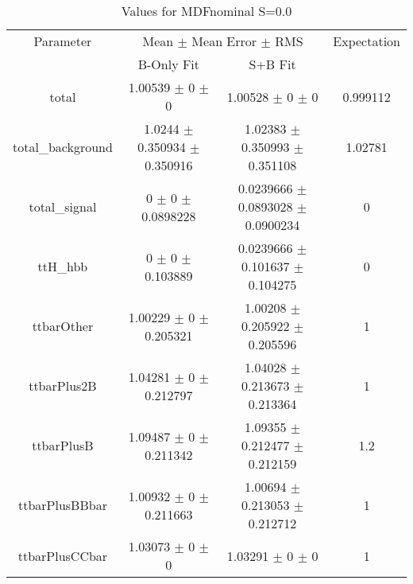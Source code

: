 \begin{table}
\centering
\caption{Values for MDFnominal S=0.0}
\begin{tabular}{cccc}
\toprule
Parameter & \multicolumn{2}{c}{Mean $\pm$ Mean Error $\pm$ RMS} & Expectation\\
 & B-Only Fit & S+B Fit & \\
\midrule
total & \num{1.00539} $\pm$ \num{0} $\pm$ \num{0} & \num{1.00528} $\pm$ \num{0} $\pm$ \num{0} & \num{0.999112}\\
total\_background & \num{1.0244} $\pm$ \num{0.350934} $\pm$ \num{0.350916} & \num{1.02383} $\pm$ \num{0.350993} $\pm$ \num{0.351108} & \num{1.02781}\\
total\_signal & \num{0} $\pm$ \num{0} $\pm$ \num{0.0898228} & \num{0.0239666} $\pm$ \num{0.0893028} $\pm$ \num{0.0900234} & \num{0}\\
ttH\_hbb & \num{0} $\pm$ \num{0} $\pm$ \num{0.103889} & \num{0.0239666} $\pm$ \num{0.101637} $\pm$ \num{0.104275} & \num{0}\\
ttbarOther & \num{1.00229} $\pm$ \num{0} $\pm$ \num{0.205321} & \num{1.00208} $\pm$ \num{0.205922} $\pm$ \num{0.205596} & \num{1}\\
ttbarPlus2B & \num{1.04281} $\pm$ \num{0} $\pm$ \num{0.212797} & \num{1.04028} $\pm$ \num{0.213673} $\pm$ \num{0.213364} & \num{1}\\
ttbarPlusB & \num{1.09487} $\pm$ \num{0} $\pm$ \num{0.211342} & \num{1.09355} $\pm$ \num{0.212477} $\pm$ \num{0.212159} & \num{1.2}\\
ttbarPlusBBbar & \num{1.00932} $\pm$ \num{0} $\pm$ \num{0.211663} & \num{1.00694} $\pm$ \num{0.213053} $\pm$ \num{0.212712} & \num{1}\\
ttbarPlusCCbar & \num{1.03073} $\pm$ \num{0} $\pm$ \num{0} & \num{1.03291} $\pm$ \num{0} $\pm$ \num{0} & \num{1}\\
\bottomrule
\end{tabular}
\end{table}